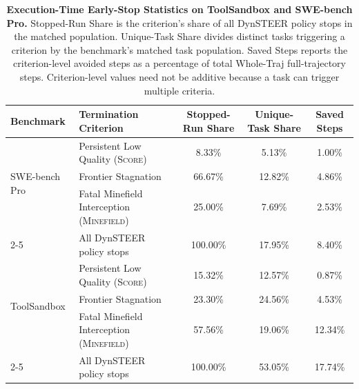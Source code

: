 \begin{table}[t]
\centering
\small
\caption{\textbf{Execution-Time Early-Stop Statistics on ToolSandbox and SWE-bench Pro.} Stopped-Run Share is the criterion's share of all DynSTEER policy stops in the matched population. Unique-Task Share divides distinct tasks triggering a criterion by the benchmark's matched task population. Saved Steps reports the criterion-level avoided steps as a percentage of total Whole-Traj full-trajectory steps. Criterion-level values need not be additive because a task can trigger multiple criteria.}
\label{tab:early_stop}
\vspace{0.1cm}
\begin{tabular}{llccc}
\toprule
\textbf{Benchmark} & \textbf{Termination Criterion} & \textbf{Stopped-Run Share} & \textbf{Unique-Task Share} & \textbf{Saved Steps} \\
\midrule
\multirow{3}{*}{SWE-bench Pro}
 & Persistent Low Quality (\textsc{Score}) & 8.33\% & 5.13\% & 1.00\% \\
 & Frontier Stagnation & 66.67\% & 12.82\% & 4.86\% \\
 & Fatal Minefield Interception (\textsc{Minefield}) & 25.00\% & 7.69\% & 2.53\% \\
\cmidrule(lr){2-5}
 & All DynSTEER policy stops & 100.00\% & 17.95\% & 8.40\% \\
\midrule
\multirow{3}{*}{ToolSandbox}
 & Persistent Low Quality (\textsc{Score}) & 15.32\% & 12.57\% & 0.87\% \\
 & Frontier Stagnation & 23.30\% & 24.56\% & 4.53\% \\
 & Fatal Minefield Interception (\textsc{Minefield}) & 57.56\% & 19.06\% & 12.34\% \\
\cmidrule(lr){2-5}
 & All DynSTEER policy stops & 100.00\% & 53.05\% & 17.74\% \\
\bottomrule
\end{tabular}
\end{table}
